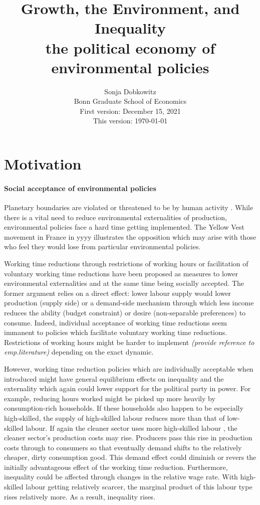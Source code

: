 \documentclass[12pt]{article}
\title{Growth, the Environment, and Inequality\\ \small{the political economy of environmental policies}}
\date{Sonja Dobkowitz\\ Bonn Graduate School of Economics\\ %
\vspace{1mm}
First version: December 15, 2021\\
This version: \today }
\newcommand{\tr}[1]{\textcolor{red}{#1}}
\begin{document}
%	
	\maketitle
	
\section{Motivation}

\paragraph{Social acceptance of environmental policies}
Planetary boundaries are violated or threatened to be by human activity \citep{Rockstrom2009AHumanity}.
While there is a vital need to reduce environmental externalities of production, environmental policies face a hard time getting implemented. The Yellow Vest movement in France in yyyy illustrates the opposition which may arise with those who feel they would lose from particular environmental policies. 

Working time reductions through restrictions of working hours \citep{Alvarez-Cuadrado2007EnvyHours} or facilitation of voluntary working time reductions \citep{Pullinger2014WorkingDesign, Schor2005SustainableReduction} have been proposed as measures to lower environmental externalities and at the same time being socially accepted. The former argument relies on a direct effect: lower labour supply would lower production (supply side) or a demand-side mechanism through which less income reduces the ability (budget constraint) or desire (non-separable preferences) to consume. Indeed, individual acceptance of working time reductions seem immanent to policies which facilitate voluntary working time reductions. Restrictions of working hours might be harder to implement \textit{(provide reference to emp.literature)} depending on the exact dynamic. 

However, working time reduction policies which are individually acceptable when introduced might have general equilibrium effects on inequality and the externality which again could lower support for the political party in power. 
For example, reducing hours worked might be picked up more heavily by consumption-rich households. If these households also happen to be especially high-skilled, the supply of high-skilled labour reduces more than that of low-skilled labour. If again the cleaner sector uses more high-skilled labour \citep[][provide evidence for this claim]{Consoli2016DoCapital}, the cleaner sector's production costs may rise. 
Producers pass this rise in production costs through to consumers so that eventually demand shifts to the relatively cheaper, dirty consumption good. This demand effect could diminish or revers the initially advantageous effect of the working time reduction. Furthermore, inequality could be affected through changes in the relative wage rate. With high-skilled labour getting relatively scarcer, the marginal product of this labour type rises relatively more. As a result, inequality rises. 
\end{document}
